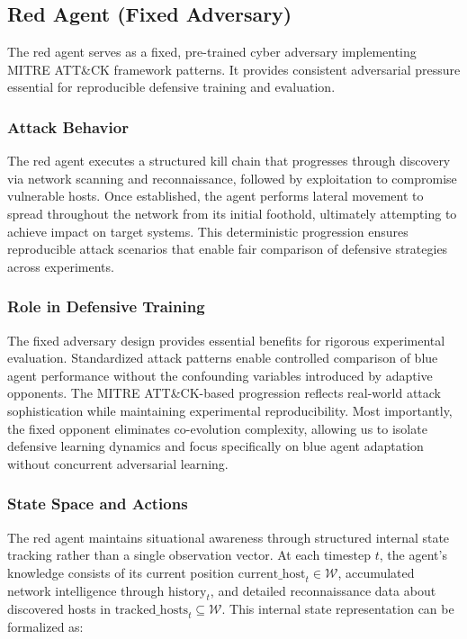 \documentclass[12pt,oneside]{article}
\begin{document}
\subsection{Red Agent (Fixed Adversary)}

The red agent serves as a fixed, pre-trained cyber adversary implementing MITRE ATT\&CK framework patterns. It provides consistent adversarial pressure essential for reproducible defensive training and evaluation.

\subsubsection{Attack Behavior}
The red agent executes a structured kill chain that progresses through discovery via network scanning and reconnaissance, followed by exploitation to compromise vulnerable hosts. Once established, the agent performs lateral movement to spread throughout the network from its initial foothold, ultimately attempting to achieve impact on target systems. This deterministic progression ensures reproducible attack scenarios that enable fair comparison of defensive strategies across experiments.

\subsubsection{Role in Defensive Training}
The fixed adversary design provides essential benefits for rigorous experimental evaluation. Standardized attack patterns enable controlled comparison of blue agent performance without the confounding variables introduced by adaptive opponents. The MITRE ATT\&CK-based progression reflects real-world attack sophistication while maintaining experimental reproducibility. Most importantly, the fixed opponent eliminates co-evolution complexity, allowing us to isolate defensive learning dynamics and focus specifically on blue agent adaptation without concurrent adversarial learning.

\subsubsection{State Space and Actions}

The red agent maintains situational awareness through structured internal state tracking rather than a single observation vector. At each timestep $t$, the agent's knowledge consists of its current position $\text{current\_host}_t \in \mathcal{W}$, accumulated network intelligence through $\text{history}_t$, and detailed reconnaissance data about discovered hosts in $\text{tracked\_hosts}_t \subseteq \mathcal{W}$. This internal state representation can be formalized as:
\end{document}
